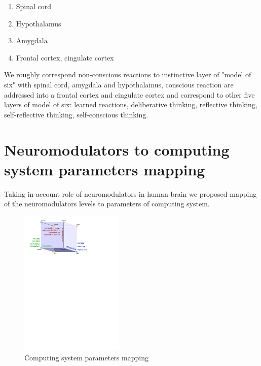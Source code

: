 \begin{enumerate}
 \item  Spinal cord
 \item  Hypothalamus
 \item  Amygdala
 \item  Frontal cortex, cingulate cortex
\end{enumerate}

We roughly correspond non-conscious reactions to instinctive layer of "model of six" \cite{emotionmachine} with spinal cord, amygdala and hypothalamus, conscious reaction are addressed into a frontal cortex and cingulate cortex and correspond to other five layers of model of six: learned reactions, deliberative thinking, reflective thinking, self-reflective thinking, self-conscious thinking.

\section{Neuromodulators to computing system parameters mapping}

Taking in account role of neuromodulators in human brain \cite{cubeofemotions, emotionsbraintorobot, neuromodulatory} we proposed mapping of the neuromodulators levels to parameters of computing system.

\begin{figure}
\begin{center}
 \includegraphics[height=7cm]{figure3_cube_of_parameters}
\end{center}
\caption{Computing system parameters mapping}
\label{figure3_cube_of_parameters}
\end{figure}

